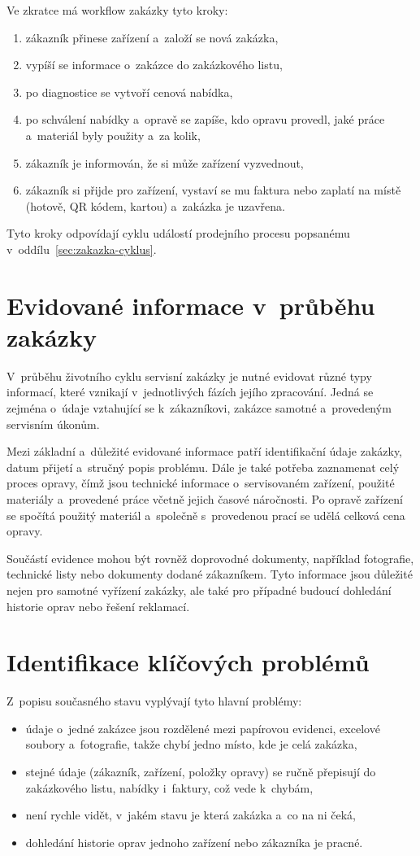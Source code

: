 Ve zkratce má workflow zakázky tyto kroky:
\begin{enumerate}
\item zákazník přinese zařízení a~založí se nová zakázka,
\item vypíší se informace o~zakázce do zakázkového listu,
\item po diagnostice se vytvoří cenová nabídka,
\item po schválení nabídky a~opravě se zapíše, kdo opravu provedl, jaké práce a~materiál byly použity a~za kolik,
\item zákazník je informován, že si může zařízení vyzvednout,
\item zákazník si přijde pro zařízení, vystaví se mu faktura nebo zaplatí na místě (hotově, QR kódem, kartou) a~zakázka je uzavřena.
\end{enumerate}
Tyto kroky odpovídají cyklu událostí prodejního procesu popsanému v~oddílu~\ref{sec:zakazka-cyklus}.

\section{Evidované informace v~průběhu zakázky}

V~průběhu životního cyklu servisní zakázky je nutné evidovat různé typy informací, které vznikají v~jednotlivých fázích jejího zpracování. Jedná se zejména o~údaje vztahující se k~zákazníkovi, zakázce samotné a~provedeným servisním úkonům.

Mezi základní a~důležité evidované informace patří identifikační údaje zakázky, datum přijetí a~stručný popis problému. Dále je také potřeba zaznamenat celý proces opravy, čímž jsou technické informace o~servisovaném zařízení, použité materiály a~provedené práce včetně jejich časové náročnosti. Po opravě zařízení se spočítá použitý materiál a~společně s~provedenou prací se udělá celková cena opravy.

Součástí evidence mohou být rovněž doprovodné dokumenty, například fotografie, technické listy nebo dokumenty dodané zákazníkem. Tyto informace jsou důležité nejen pro samotné vyřízení zakázky, ale také pro případné budoucí dohledání historie oprav nebo řešení reklamací.

\section{Identifikace klíčových problémů}

Z~popisu současného stavu vyplývají tyto hlavní problémy:
\begin{itemize}
\item údaje o~jedné zakázce jsou rozdělené mezi papírovou evidenci, excelové soubory a~fotografie, takže chybí jedno místo, kde je celá zakázka,
\item stejné údaje (zákazník, zařízení, položky opravy) se ručně přepisují do zakázkového listu, nabídky i~faktury, což vede k~chybám,
\item není rychle vidět, v~jakém stavu je která zakázka a~co na ni čeká,
\item dohledání historie oprav jednoho zařízení nebo zákazníka je pracné.
\end{itemize}

